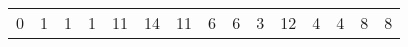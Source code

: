 \documentclass{article}
\begin{document}
 \begin{tabular}{ |l | l | l | l | l | l | l | l | l | l | l | l | l | l | l | }
0 & 1 & 1 & 1 & 11 & 14 & 11 & 6 & 6 & 3 & 12 & 4 & 4 & 8 & 8 \\ 
\end{tabular}
\end{document}
